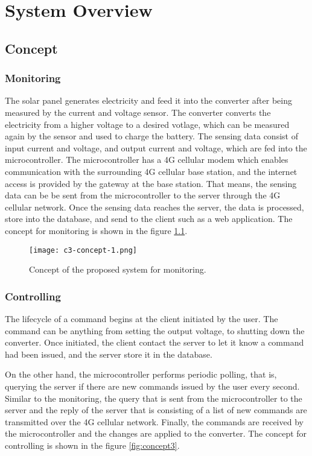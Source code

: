 \documentclass[../thesis.tex]{subfiles}
\begin{document}
\chapter{System Overview}
\label{chap:syso}

\section{Concept}


\subsection{Monitoring}
The solar panel generates electricity and feed it into the converter after being measured by the current and voltage sensor. The converter converts the electricity from a higher voltage to a desired votlage, which can be measured again by the sensor and used to charge the battery. The sensing data consist of input current and voltage, and output current and voltage, which are fed into the microcontroller. The microcontroller has a 4G cellular modem which enables communication with the surrounding 4G cellular base station, and the internet access is provided by the gateway at the base station. That means, the sensing data can be be sent from the microcontroller to the server through the 4G cellular network. Once the sensing data reaches the server, the data is processed, store into the database, and send to the client such as a web application. The concept for monitoring is shown in the figure \ref{fig:concept1}.

\begin{figure}[!ht]
  \texttt{[image: c3-concept-1.png]}
  \caption{Concept of the proposed system for monitoring.}
  \label{fig:concept1}
\end{figure}


\newpage
\subsection{Controlling}
The lifecycle of a command begins at the client initiated by the user. The command can be anything from setting the output voltage, to shutting down the converter. Once initiated, the client contact the server to let it know a command had been issued, and the server store it in the database. 

On the other hand, the microcontroller performs periodic polling, that is, querying the server if there are new commands issued by the user every second. Similar to the monitoring, the query that is sent from the microcontroller to the server and the reply of the server that is consisting of a list of new commands are transmitted over the 4G cellular network. Finally, the commands are received by the microcontroller and the changes are applied to the converter. The concept for controlling is shown in the figure \ref{fig:concept3}.
\end{document}
